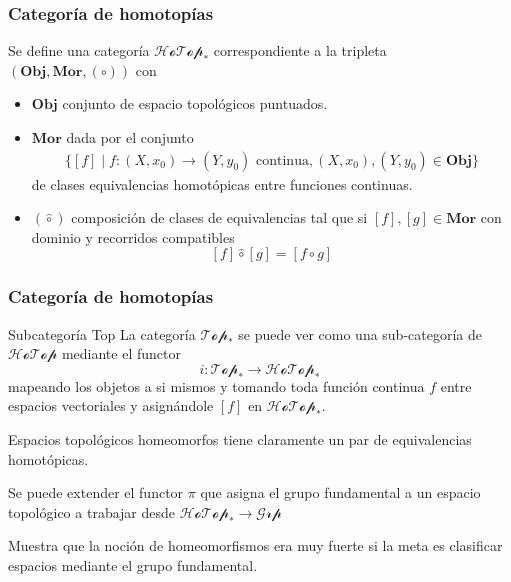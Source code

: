 \documentclass[xetex,mathserif,serif]{beamer}
\begin{document}
  \begin{frame}
    \frametitle{Categoría de homotopías}
    Se define una categoría \(\mathscr{HoTop}_*\) correspondiente
    a la tripleta \(\left( \mathbf{Obj}, \mathbf{Mor}, (\circ) \right)\)
    con
    \begin{itemize}
    \item \(\mathbf {Obj}\) conjunto de espacio topológicos puntuados.
    \item \(\mathbf{Mor}\) dada por el conjunto
      \begin{align*}
        \{ [f] \mid f : (X,x_0) \to (Y,y_0) \text{ continua} ,(X,x_0),(Y,y_0) \in \mathbf {Obj}\}
      \end{align*}
      de clases equivalencias homotópicas entre funciones continuas.
    \item \((\hat \circ)\) composición de clases de
      equivalencias tal que si \([f] , [g] \in \mathbf {Mor} \) con
      dominio y recorridos compatibles
      \[ [f] \hat \circ [g] = [f \circ g]\]
    \end{itemize}
  \end{frame}
  \begin{frame}
    \frametitle{Categoría de homotopías}
    \begin{block}{Subcategoría Top}
      La categoría \(\mathscr{Top}_*\) se puede ver como una
      sub-categoría de \(\mathscr{HoTop}\) mediante el functor
      \[ i : \mathscr{Top}_* \to \mathscr{HoTop}_*\]
      mapeando los objetos a si mismos y tomando toda función continua
      \(f\) entre espacios vectoriales y asignándole \([f]\) en
      \(\mathscr{HoTop}_*\).

      Espacios topológicos homeomorfos tiene claramente un par de
      equivalencias homotópicas.

      Se puede extender el functor \(\pi\) que asigna el grupo
      fundamental a un espacio topológico a trabajar desde
      \(\mathscr{HoTop}_* \to \mathscr{Grp}\)

      Muestra que la noción de homeomorfismos era muy fuerte si la meta
      es clasificar espacios mediante el grupo fundamental.
    \end{block}
  \end{frame}
\end{document}
